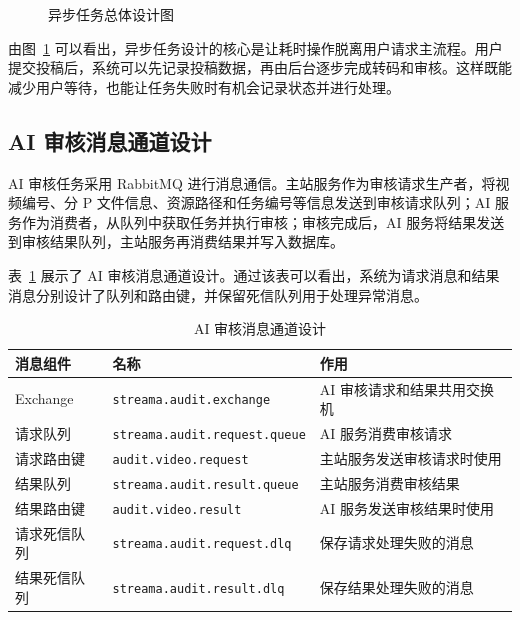 \begin{figure}[htbp]
  \centering
  \caption{异步任务总体设计图}
  \label{fig:async-task-design}
\end{figure}

由图~\ref{fig:async-task-design} 可以看出，异步任务设计的核心是让耗时操作脱离用户请求主流程。用户提交投稿后，系统可以先记录投稿数据，再由后台逐步完成转码和审核。这样既能减少用户等待，也能让任务失败时有机会记录状态并进行处理。

\subsection{AI 审核消息通道设计}
\label{subsec:ai-message-channel-design}

AI 审核任务采用 RabbitMQ 进行消息通信。主站服务作为审核请求生产者，将视频编号、分 P 文件信息、资源路径和任务编号等信息发送到审核请求队列；AI 服务作为消费者，从队列中获取任务并执行审核；审核完成后，AI 服务将结果发送到审核结果队列，主站服务再消费结果并写入数据库。

表~\ref{tab:ai-message-channel} 展示了 AI 审核消息通道设计。通过该表可以看出，系统为请求消息和结果消息分别设计了队列和路由键，并保留死信队列用于处理异常消息。

\begin{table}[htbp]
  \centering
  \caption{AI 审核消息通道设计}
  \label{tab:ai-message-channel}
  \begin{tabular}{p{}p{}p{}}
    \hline
    \textbf{消息组件} & \textbf{名称} & \textbf{作用} \\
    \hline
    Exchange & \texttt{streama.audit.exchange} & AI 审核请求和结果共用交换机 \\
    请求队列 & \texttt{streama.audit.request.queue} & AI 服务消费审核请求 \\
    请求路由键 & \texttt{audit.video.request} & 主站服务发送审核请求时使用 \\
    结果队列 & \texttt{streama.audit.result.queue} & 主站服务消费审核结果 \\
    结果路由键 & \texttt{audit.video.result} & AI 服务发送审核结果时使用 \\
    请求死信队列 & \texttt{streama.audit.request.dlq} & 保存请求处理失败的消息 \\
    结果死信队列 & \texttt{streama.audit.result.dlq} & 保存结果处理失败的消息 \\
    \hline
  \end{tabular}
\end{table}

